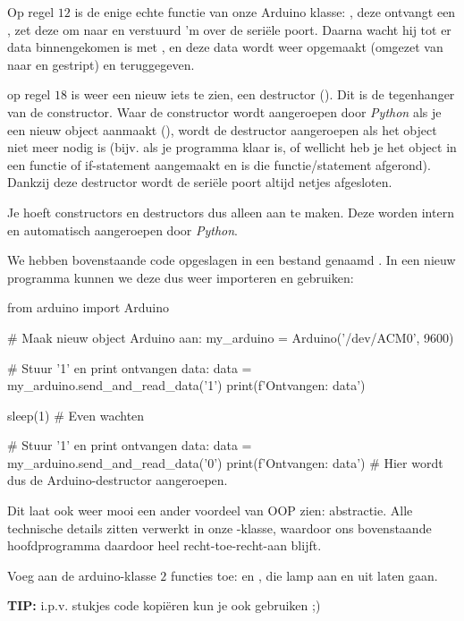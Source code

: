 Op regel $12$ is de enige echte functie van onze Arduino klasse: , deze ontvangt een , zet deze om naar  en verstuurd 'm over de seriële poort. Daarna wacht hij tot er data binnengekomen is met , en deze data wordt weer opgemaakt (omgezet van  naar  en gestript) en teruggegeven. 

op regel $18$ is weer een nieuw iets te zien, een destructor (). Dit is de tegenhanger van de constructor. Waar de constructor wordt aangeroepen door \textit{Python} als je een nieuw object aanmaakt (), wordt de destructor aangeroepen als het object niet meer nodig is (bijv. als je programma klaar is, of wellicht heb je het object in een functie of if-statement aangemaakt en is die functie/statement afgerond). Dankzij deze destructor wordt de seriële poort altijd netjes afgesloten.
\begin{remark}
Je hoeft constructors en destructors dus alleen aan te maken. Deze worden intern en automatisch aangeroepen door \textit{Python}. 
\end{remark}

We hebben bovenstaande code opgeslagen in een bestand genaamd . In een nieuw programma kunnen we deze dus weer importeren en gebruiken:
\begin{python}
from arduino import Arduino

# Maak nieuw object Arduino aan:
my_arduino = Arduino('/dev/ACM0', 9600)

# Stuur '1' en print ontvangen data:
data = my_arduino.send_and_read_data('1')
print(f'Ontvangen: {data}')

sleep(1)  # Even wachten

# Stuur '1' en print ontvangen data:
data = my_arduino.send_and_read_data('0')
print(f'Ontvangen: {data}')
# Hier wordt dus de Arduino-destructor aangeroepen.
\end{python}

Dit laat ook weer mooi een ander voordeel van OOP zien: abstractie. Alle technische details zitten verwerkt in onze -klasse, waardoor ons bovenstaande hoofdprogramma daardoor heel recht-toe-recht-aan blijft. 

\begin{exercise}
Voeg aan de arduino-klasse $2$ functies toe:  en , die lamp aan en uit laten gaan.  

\textbf{TIP:} i.p.v. stukjes code kopiëren kun je ook  gebruiken ;)
\end{exercise}

